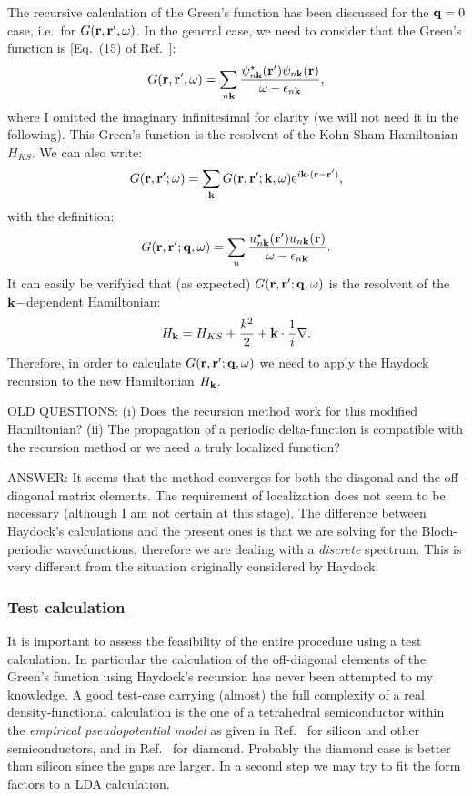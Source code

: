 \documentclass[12pt]{article}
\def\k{{\bf k}}
\def\q{{\bf q}}
\def\r{{\bf r}}
\def\rp{{\bf r}^\prime}
\def\w{\omega}
\begin{document}
The recursive calculation of the Green's function has been discussed for the $\q=0$ case, i.e.\ for $G(\r,\rp,\w)$.
In the general case, we need to consider that the Green's function is [Eq.\ (15) of Ref.\ \cite{hl86}]:
  \begin{equation}
  G(\r,\rp,\w) = \sum_{n\k} \frac{\psi^\star_{n\k}(\rp)\psi_{n\k}(\r)}{\w-\epsilon_{n\k}},
  \end{equation} 
where I omitted the imaginary infinitesimal for clarity (we will not need it in the following).
This Green's function is the resolvent of the Kohn-Sham Hamiltonian $H_{KS}$. We can also write:
  \begin{equation}
  G(\r,\rp;\w) = \sum_\k G(\r,\rp;\k,\w) {\rm e}^{i\k\cdot(\r-\rp)},
  \end{equation} 
with the definition:
  \begin{equation}
  G(\r,\rp;\q,\w) = \sum_n \frac{u^\star_{n\k}(\rp)u_{n\k}(\r)}{\w-\epsilon_{n\k}}.
  \end{equation}
It can easily be verifyied that (as expected) $G(\r,\rp;\q,\w)$ is the resolvent of the $\k-$dependent Hamiltonian:
  \begin{equation} \label{eq.Hk}
  H_\k = H_{KS} + \frac{k^2}{2} + \k\cdot\frac{1}{i}\nabla.
  \end{equation}
Therefore, in order to calculate $G(\r,\rp;\q,\w)$ we need to apply the Haydock recursion to the new Hamiltonian
$H_\k$. 

\noindent
OLD QUESTIONS:
(i) Does the recursion method work for this modified Hamiltonian? (ii)
The propagation of a periodic delta-function is compatible with the recursion method or we need a truly
localized function?

\noindent
ANSWER: It seems that the method converges for both the diagonal and the off-diagonal matrix elements.
The requirement of localization does not seem to be necessary (although I am not certain at this stage).
The difference between Haydock's calculations and the present ones is that we are solving for the
Bloch-periodic wavefunctions, therefore we are dealing with a {\it discrete} spectrum. This is
very different from the situation originally considered by Haydock.


\subsubsection*{Test calculation}

It is important to assess the feasibility of the entire procedure using a test calculation.
In particular the calculation of the off-diagonal elements of the Green's function using
Haydock's recursion has never been attempted to my knowledge.
A good test-case carrying (almost) the full complexity of a real density-functional calculation
is the one of a tetrahedral semiconductor within the {\it empirical
pseudopotential model} as given in Ref.\ \cite{epm} for silicon and other semiconductors,
and in Ref.\ \cite{epm-diamond} for diamond.
Probably the diamond case is better than silicon since the gaps are larger.
In a second step we may try to fit the form factors to a LDA calculation.
\end{document}
